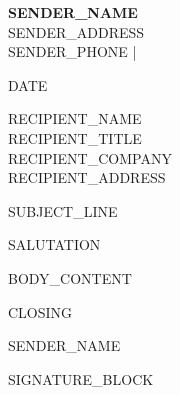 \documentclass[11pt,a4paper]{article}
\begin{document}
\begin{flushright}
{\small
\textbf{{{SENDER_NAME}}}\\
{{SENDER_ADDRESS}}\\
{{SENDER_PHONE}} \quad | 
}
\end{flushright}

\vspace{1em}

{{DATE}}

\vspace{1em}

{{RECIPIENT_NAME}}\\
{{RECIPIENT_TITLE}}\\
{{RECIPIENT_COMPANY}}\\
{{RECIPIENT_ADDRESS}}

\vspace{1em}

{{SUBJECT_LINE}}

\vspace{0.5em}

{{SALUTATION}}

\vspace{0.5em}

{{BODY_CONTENT}}

\vspace{1em}

{{CLOSING}}

\vspace{2em}

{{SENDER_NAME}}

{{SIGNATURE_BLOCK}}
\end{document}
